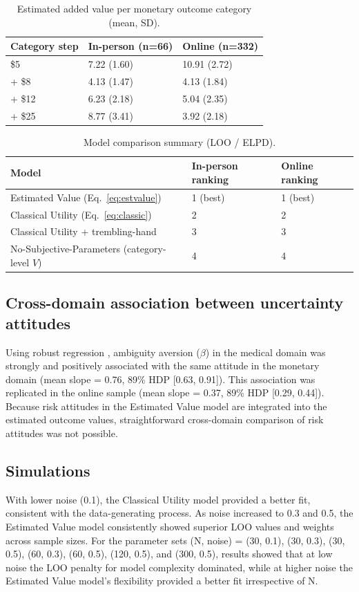 \documentclass[11pt]{article}
\begin{document}
\begin{table}[h]
\centering
\caption{Estimated added value per monetary outcome category (mean, SD).}
\begin{tabular}{lll}
\toprule
Category step & In-person (n=66) & Online (n=332) \\
\midrule
\$5 & 7.22 (1.60) & 10.91 (2.72) \\
+ \$8 & 4.13 (1.47) & 4.13 (1.84) \\
+ \$12 & 6.23 (2.18) & 5.04 (2.35) \\
+ \$25 & 8.77 (3.41) & 3.92 (2.18) \\
\bottomrule
\end{tabular}
\end{table}

\begin{table}[h]
\centering
\caption{Model comparison summary (LOO / ELPD).}
\begin{tabular}{lll}
\toprule
Model & In-person ranking & Online ranking \\
\midrule
Estimated Value (Eq.~\ref{eq:estvalue}) & 1 (best) & 1 (best) \\
Classical Utility (Eq.~\ref{eq:classic}) & 2 & 2 \\
Classical Utility + trembling-hand & 3 & 3 \\
No-Subjective-Parameters (category-level $V$) & 4 & 4 \\
\bottomrule
\end{tabular}
\end{table}

\subsection{Cross-domain association between uncertainty attitudes}
Using robust regression \cite{pernet2012robust,yu2017robust}, ambiguity aversion ($\beta$) in the medical domain was strongly and positively associated with the same attitude in the monetary domain (mean slope = 0.76, 89\% HDP [0.63, 0.91]). This association was replicated in the online sample (mean slope = 0.37, 89\% HDP [0.29, 0.44]). Because risk attitudes in the Estimated Value model are integrated into the estimated outcome values, straightforward cross-domain comparison of risk attitudes was not possible.

\subsection{Simulations}
With lower noise (0.1), the Classical Utility model provided a better fit, consistent with the data-generating process. As noise increased to 0.3 and 0.5, the Estimated Value model consistently showed superior LOO values and weights across sample sizes. For the parameter sets (N, noise) = (30, 0.1), (30, 0.3), (30, 0.5), (60, 0.3), (60, 0.5), (120, 0.5), and (300, 0.5), results showed that at low noise the LOO penalty for model complexity dominated, while at higher noise the Estimated Value model's flexibility provided a better fit irrespective of N.
\end{document}
